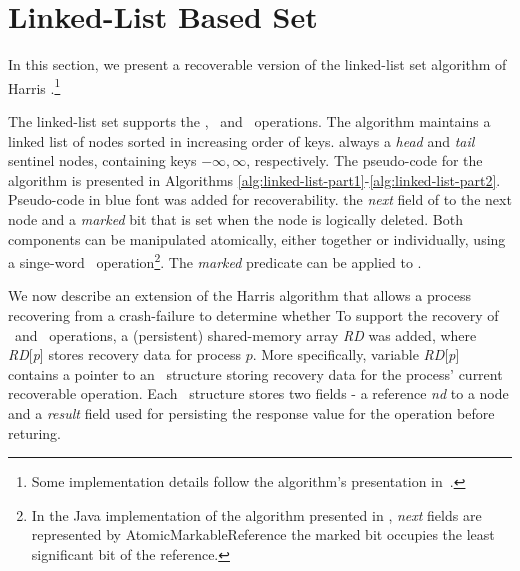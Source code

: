\section{Linked-List Based Set}
\label{section-linked-list}

In this section, we present a recoverable version of the linked-list set algorithm of Harris \cite{DBLP:conf/wdag/Harris01}.\footnote{Some implementation details 
follow the algorithm's presentation in~\cite{DBLP:books/daglib/0020056}.}
 
The linked-list set supports the \find, \insertlst\ and \delete\ operations. 
The algorithm maintains a linked list of nodes sorted in increasing order of keys. 
 always  a \emph{head} and \emph{tail} sentinel nodes, 
containing keys $-\infty, \infty$, respectively.
The pseudo-code for the algorithm is presented 
in Algorithms \ref{alg:linked-list-part1}-\ref{alg:linked-list-part2}.
Pseudo-code in blue font was added for recoverability. 
the \emph{next} field of  to the next node and a \emph{marked} bit that is set when the node is logically deleted. 
Both components can be manipulated atomically, either together or individually, 
using a singe-word \CAS\ operation\footnote{In the Java implementation of the algorithm 
presented in \cite{DBLP:books/daglib/0020056}, \emph{next} fields are represented 
by AtomicMarkableReference 
the marked bit occupies the least significant bit of the reference.}. 
The \emph{marked} predicate can be applied 
to .


We now describe an extension of the Harris algorithm 
that allows a process recovering from a crash-failure 
to determine whether 
To support the recovery of \insertlst\ and \delete\ operations, 
a (persistent) shared-memory array \emph{RD} was added, 
where \emph{RD}[\emph{p}] stores recovery data for process $p$. 
More specifically, variable \emph{RD}[\emph{p}] contains a pointer 
to an \Info\ structure storing recovery data for the process' current recoverable operation. 
Each \Info\ structure stores two fields - a reference \emph{nd} to a node 
and a \emph{result} field used for persisting the response value for the operation before returing.

